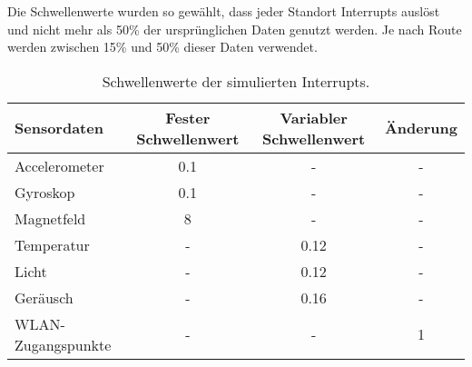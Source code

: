 Die Schwellenwerte wurden so gewählt, dass jeder Standort Interrupts auslöst und nicht mehr als 50\% der ursprünglichen Daten genutzt werden.
Je nach Route werden zwischen 15\% und 50\% dieser Daten verwendet.
\begin{table}[h!]
    \centering
    \begin{tabular}{ | l | c | c | c | }
        \hline
        Sensordaten & Fester Schwellenwert & Variabler Schwellenwert & Änderung \\\hline
        Accelerometer & 0.1 & - & - \\\hline
        Gyroskop & 0.1 & - & - \\\hline
        Magnetfeld & 8 & - & - \\\hline
        Temperatur & - & 0.12 & - \\\hline
        Licht & - & 0.12 & - \\\hline
        Geräusch & - & 0.16 & - \\\hline
        WLAN-Zugangspunkte & - & - & 1 \\\hline
    \end{tabular}
    \caption{Schwellenwerte der simulierten Interrupts.}
    \label{tab:interrupt_values}
\end{table}

